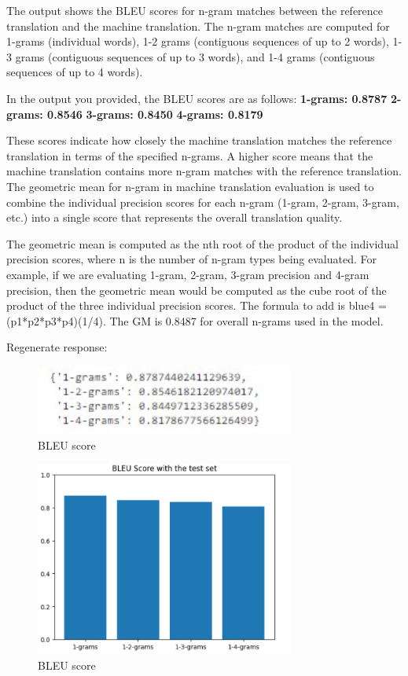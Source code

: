 \documentclass{article}
\begin{document}
The output shows the BLEU scores for n-gram matches between the reference translation and the machine translation. The n-gram matches are computed for 1-grams (individual words), 1-2 grams (contiguous sequences of up to 2 words), 1-3 grams (contiguous sequences of up to 3 words), and 1-4 grams (contiguous sequences of up to 4 words).

In the output you provided, the BLEU scores are as follows:
\textbf{1-grams: 0.8787}
\textbf{2-grams: 0.8546}
\textbf{3-grams: 0.8450}
\textbf{4-grams: 0.8179}

These scores indicate how closely the machine translation matches the reference translation in terms of the specified n-grams. A higher score means that the machine translation contains more n-gram matches with the reference translation. 
\cite{schwenk2007smooth}
\cite{yao2018improved}
The geometric mean for n-gram in machine translation evaluation is used to combine the individual precision scores for each n-gram (1-gram, 2-gram, 3-gram, etc.) into a single score that represents the overall translation quality.

The geometric mean is computed as the nth root of the product of the individual precision scores, where n is the number of n-gram types being evaluated. For example, if we are evaluating 1-gram, 2-gram, 3-gram precision and 4-gram precision, then the geometric mean would be computed as the cube root of the product of the three individual precision scores. The formula to add is blue4 = (p1*p2*p3*p4)(1/4). The GM is 0.8487 for overall n-grams used in the model. \cite{rahit2020machine}


Regenerate response: 

\begin{figure}[htp]
    \centering
    \includegraphics[width=8.5cm]{6.jpg}
    \caption{BLEU score}
    \label{fig:galaxy}
\end{figure}

\begin{figure}[htp]
    \centering
    \includegraphics[width=8.5cm]{11.PNG}
    \caption{BLEU score}
    \label{fig:galaxy}
\end{figure} \\ 
\end{document}
